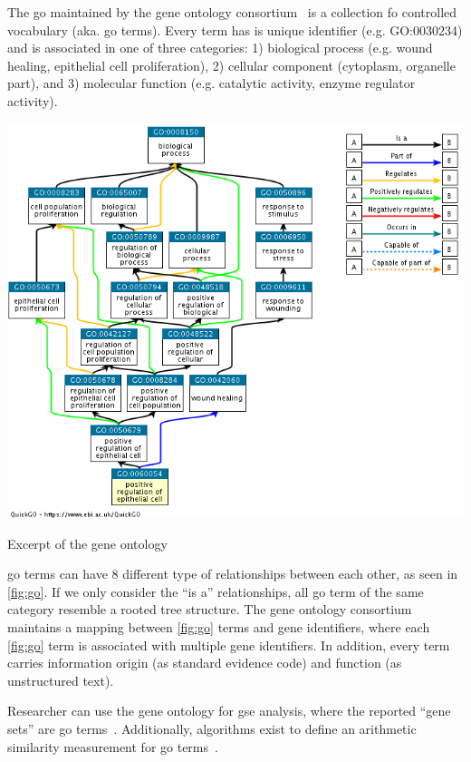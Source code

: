 \documentclass{thesisclass}
\begin{document}

The \acrfull{go} maintained by the gene ontology consortium~\cite{Ashburner2000,doi:10.1093/nar/gkw1108} is a collection fo controlled vocabulary (aka. \acrshort{go} terms). Every term has is unique identifier (e.g. GO:0030234) and is associated in one of three categories: 1) biological process (e.g. wound healing, epithelial cell proliferation), 2) cellular component (cytoplasm, organelle part), and 3) molecular function (e.g. catalytic activity, enzyme regulator activity). 

\begin{centeredFigure}[!h]
	\includegraphics[scale=0.4]{figures/introduction/go.png}
	\caption{Excerpt of the gene ontology}
	\label{fig:go}
\end{centeredFigure}

\acrshort{go} terms can have 8 different type of relationships between each other, as seen in \cref{fig:go}. If we only consider the ``is a'' relationships, all \acrshort{go} term of the same category resemble a rooted tree structure. The gene ontology consortium maintains a mapping between \cref{fig:go} terms and gene identifiers, where each \cref{fig:go} term is associated with multiple gene identifiers. In addition, every term carries information origin (as standard evidence code) and function (as unstructured text).

Researcher can use the gene ontology for \acrshort{gse} analysis, where the reported ``gene sets'' are \acrshort{go} terms~\cite{doi:10.1093/bioinformatics/btl140}.  Additionally, algorithms exist to define an arithmetic similarity measurement for \acrshort{go} terms~\cite{doi:10.1093/bioinformatics/btq064}.
\end{document}
